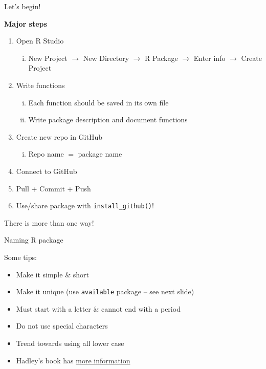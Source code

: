 \documentclass[
  ignorenonframetext,
]{beamer}
\providecommand{\tightlist}{%
  \setlength{\itemsep}{0pt}\setlength{\parskip}{0pt}}
\begin{document}
\begin{frame}[fragile]{Let's begin!}
\protect\hypertarget{lets-begin}{}

\textbf{Major steps}

\small

\begin{enumerate}
\tightlist
\item
  Open R Studio

  \begin{enumerate}
  [i)]
  \tightlist
  \item
    New Project \(\rightarrow\) New Directory \(\rightarrow\) R Package
    \(\rightarrow\) Enter info \(\rightarrow\) Create Project
  \end{enumerate}
\item
  Write functions

  \begin{enumerate}
  [i)]
  \tightlist
  \item
    Each function should be saved in its own file
  \item
    Write package description and document functions
  \end{enumerate}
\item
  Create new repo in GitHub

  \begin{enumerate}
  [i)]
  \tightlist
  \item
    Repo name \(=\) package name
  \end{enumerate}
\item
  Connect to GitHub
\item
  Pull + Commit + Push
\item
  Use/share package with \texttt{install\_github()}!
\end{enumerate}

\centering

\alert{There is more than one way!}

\end{frame}

\begin{frame}[fragile]{Naming R package}
\protect\hypertarget{naming-r-package}{}

Some tips:

\begin{itemize}
\tightlist
\item
  Make it simple \& short
\item
  Make it unique (use \texttt{available} package -- see next slide)
\item
  Must start with a letter \& cannot end with a period
\item
  Do not use special characters
\item
  Trend towards using all lower case
\item
  Hadley's book has
  \href{https://r-pkgs.org/workflows101.html?q=naming\#naming}{more
  information}
\end{itemize}

\end{frame}
\end{document}
